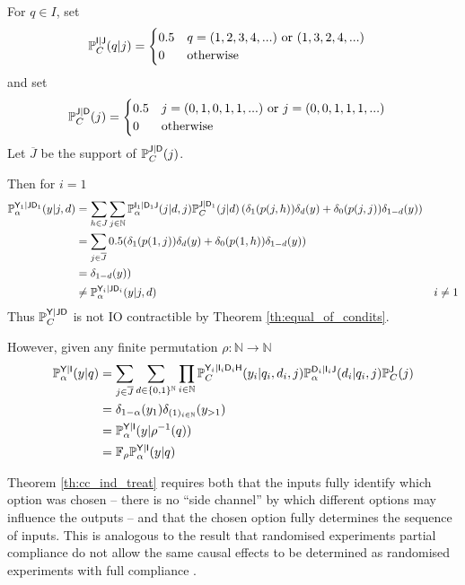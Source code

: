 \begin{example}
For $q\in I$, set
\begin{align}
    \mathbb{P}_C^{\mathsf{I}|\mathsf{J}}(q|j)&= \begin{cases}
        0.5 & q=(1,2,3,4,...) \text{ or } (1,3,2,4,...)\\
        0&\text{otherwise}
    \end{cases}
\end{align}
and set
\begin{align}
    \mathbb{P}_C^{\mathsf{J}|\mathsf{D}}(j) &= \begin{cases}
        0.5 & j=(0,1,0,1,1,...)\text{ or }j=(0,0,1,1,1,...)\\
        0 &\text{otherwise}
    \end{cases}
\end{align}
Let $\overline{J}$ be the support of $\mathbb{P}_C^{\mathsf{J}|\mathsf{D}}(j)$.

Then for $i=1$
\begin{align}
    \mathbb{P}_\alpha^{\mathsf{Y}_1|\mathsf{J}\mathsf{D}_1}(y|j,d) &= \sum_{h\in J} \sum_{j\in \mathbb{N}} \mathbb{P}_\alpha^{\mathsf{I}_1|\mathsf{D}_1\mathsf{J}}(j|d,j)\mathbb{P}_C^{\mathsf{J}|\mathsf{D}_1}(j|d)\left(\delta_1(p(j,h))\delta_d(y) + \delta_0(p(j,j))\delta_{1-d}(y)\right)\\
    &= \sum_{j\in \overline{J}} 0.5( \delta_1(p(1,j))\delta_d(y) + \delta_0(p(1,h))\delta_{1-d}(y))\\
    &= \delta_{1-d}(y))\\
    &\neq  \mathbb{P}_\alpha^{\mathsf{Y}_i|\mathsf{J}\mathsf{D}_i}(y|j,d) & i\neq 1
\end{align}
Thus $\mathbb{P}_C^{\mathsf{Y}|\mathsf{J}\mathsf{D}}$ is not IO contractible by Theorem \ref{th:equal_of_condits}. 

However, given any finite permutation $\rho:\mathbb{N}\to\mathbb{N}$
\begin{align}
    \mathbb{P}_\alpha^{\mathsf{Y}|\mathsf{I}}(y|q) &= \sum_{j\in \overline{J}}\sum_{d\in\{0,1\}^{\mathbb{N}}} \prod_{i\in \mathbb{N}} \mathbb{P}_C^{\mathsf{Y}_i|\mathsf{I}_i\mathsf{D}_i\mathsf{H}}(y_i|q_i,d_i,j) \mathbb{P}_\alpha^{\mathsf{D}_i|\mathsf{I}_i\mathsf{J}}(d_i|q_i,j)\mathbb{P}_C^{\mathsf{J}}(j)\\
    &= \delta_{1-\alpha}(y_1)\delta_{(1)_{i\in\mathbb{N}}}(y_{>1})\\
    &= \mathbb{P}_\alpha^{\mathsf{Y}|\mathsf{I}}(y|\rho^{-1}(q))\\
    &= \mathbb{F}_{\rho}\mathbb{P}_\alpha^{\mathsf{Y}|\mathsf{I}}(y|q)
\end{align}
\end{example}

Theorem \ref{th:cc_ind_treat} requires both that the inputs fully identify which option was chosen -- there is no ``side channel'' by which different options may influence the outputs -- and that the chosen option fully determines the sequence of inputs. This is analogous to the result that randomised experiments partial compliance do not allow the same causal effects to be determined as randomised experiments with full compliance \citep[Sec. 8.1.2]{pearl_causality:_2009}.

